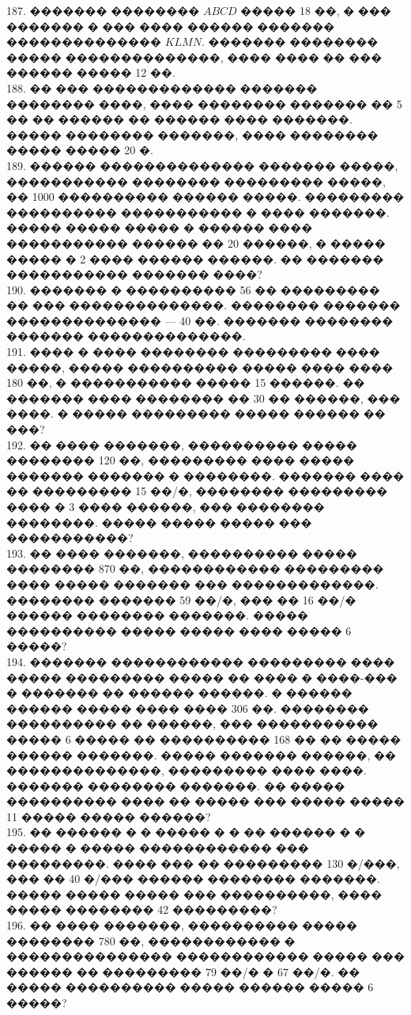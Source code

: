 \documentclass[12pt]{article}
\begin{document}
187. ������� �������� $ABCD$ ����� 18 ��, � ��� ������� � ��� ���� ������ ������� �������������� $KLMN.$ ������� �������� ����� ��������������, ���� ���� �� ��� ������ ����� 12 ��.\\
188. �� ��� ������������� ������� �������� ����, ���� �������� ������� ��  5 �� �� ������ �� ������ ���� �������. ����� �������� �������, ���� �������� ����� ����� 20 �.\\
189.  ������ �������������� ������� �����, ����������� �������� ��������� �����, �� 1000 ���������� ������ �����. ��������� ���������� ����������� � ���� �������. ����� ����� ����� � ������ ���� ����������� ������ �� 20 ������, � ����� ����� � 2 ���� ������ ������. �� ������� ����������� ������� ����?\\
190.  ������� � ���������� 56 �� ��������� �� ��� ��������������. �������� ������� �������������� --- 40 ��. ������� �������� ������� ��������������.\\
191. ���� � ���� ��������  ��������� ���� �����, ����� ���������� ����� ���� ���� 180 ��, � ����������� ����� 15 ������. �� ������� ���� �������� �� 30 �� ������, ��� ����. � ����� ��������� ����� ������ �� ���?\\
192. �� ���� �������, ���������� ����� �������� 120 ��, ��������� ���� ����� ������� ������� � ��������. ������� ���� �� ��������� 15 ��/�, �������� ��������� ���� � 3 ���� ������, ��� �������� ��������. ����� ����� ����� ��� �����������?\\
193. �� ���� �������, ���������� ����� ��������  870 ��, ������������ ��������� ���� ����� ������� ��� �������������. �������� ������� 59 ��/�, ��� �� 16 ��/� ������ �������� �������. ����� ���������� ����� ����� ���� ����� 6 �����?\\
194. ������� ������������ ��������� ���� ����� ��������� ����� �� ���� � ����-��� � ������� �� ������ ������. � ������ ������ ����� ���� ���� 306 ��. �������� ���������� �� ������, ��� ����������� ����� 6 ����� �� ���������� 168 �� �� ����� ������ �������. ����� ������� ������, �� ��������������, ��������� ���� ����. ������� �������� �������. �� ����� ���������� ���� �� ����� ��� ����� ����� 11 ����� ����� ������?\\
195. �� ������ � � ����� � � �� ������ � � ����� � ����� ������������ ��� ���������. ���� ��� �� ��������� 130 �/���, ��� �� 40 �/��� ������ �������� �������. ����� ����� ����� ��� ����������, ���� ����� �������� 42 ���������?\\
196. �� ���� �������, ���������� ����� �������� 780 ��, ������������ � ��������������� ������������ ����� ��� ������ �� ��������� 79 ��/� � 67 ��/�. �� ����� ���������� ����� ������ ����� 6 �����?\\
\end{document}
